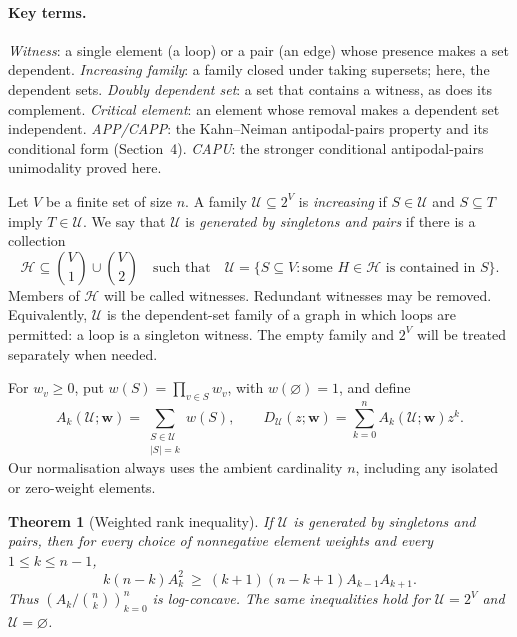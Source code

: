 \documentclass[11pt,a4paper]{article}
\newtheorem{theorem}{Theorem}[section]
\theoremstyle{remark}
\newcommand{\U}{\mathcal U}
\newcommand{\wt}{\boldsymbol w}
\begin{document}
\paragraph{Key terms.} \emph{Witness}: a single element (a loop) or a pair (an edge) whose presence makes a set dependent. \emph{Increasing family}: a family closed under taking supersets; here, the dependent sets. \emph{Doubly dependent set}: a set that contains a witness, as does its complement. \emph{Critical element}: an element whose removal makes a dependent set independent. \emph{APP/CAPP}: the Kahn--Neiman antipodal-pairs property and its conditional form (Section~4). \emph{CAPU}: the stronger conditional antipodal-pairs unimodality proved here.

Let $V$ be a finite set of size $n$. A family $\U\subseteq2^V$ is \emph{increasing} if $S\in\U$ and $S\subseteq T$ imply $T\in\U$. We say that $\U$ is \emph{generated by singletons and pairs} if there is a collection
\[
\mathcal H\subseteq\binom V1\cup\binom V2
\quad\text{such that}\quad
\U=\{S\subseteq V:\text{some }H\in\mathcal H\text{ is contained in }S\}.
\]
Members of $\mathcal H$ will be called witnesses. Redundant witnesses may be removed. Equivalently, $\U$ is the dependent-set family of a graph in which loops are permitted: a loop is a singleton witness. The empty family and $2^V$ will be treated separately when needed.

For $w_v\geq0$, put $w(S)=\prod_{v\in S}w_v$, with $w(\varnothing)=1$, and define
\[
A_k(\U;\wt)=\sum_{\substack{S\in\U\\|S|=k}}w(S),
\qquad
D_{\U}(z;\wt)=\sum_{k=0}^n A_k(\U;\wt)z^k.
\]
Our normalisation always uses the ambient cardinality $n$, including any isolated or zero-weight elements.

\begin{theorem}[Weighted rank inequality]\label{thm:main}
If $\U$ is generated by singletons and pairs, then for every choice of nonnegative element weights and every $1\leq k\leq n-1$,
\begin{equation}\label{eq:main}
k(n-k)A_k^2\ \geq\ (k+1)(n-k+1)A_{k-1}A_{k+1}.
\end{equation}
Thus $(A_k/\binom nk)_{k=0}^n$ is log-concave. The same inequalities hold for $\U=2^V$ and $\U=\varnothing$.
\end{theorem}
\end{document}
